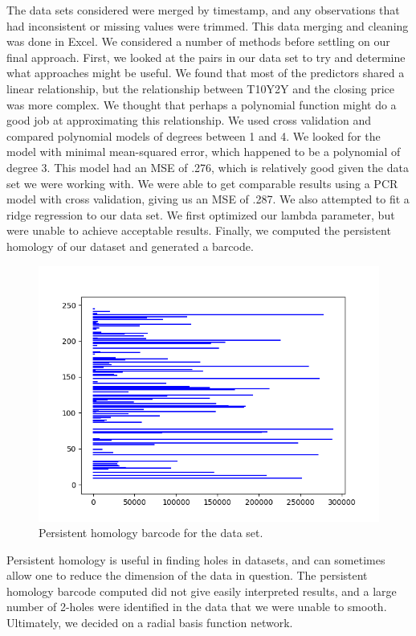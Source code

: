 \documentclass[12pt]{article}
\begin{document}
    The data sets considered were merged by timestamp, and any observations that had inconsistent or missing values were trimmed. This data merging and cleaning was done in Excel. We considered a number of methods before settling on our final approach. First, we looked at the pairs in our data set to try and determine what approaches might be useful. We found that most of the predictors shared a linear relationship, but the relationship between T10Y2Y and the closing price was more complex. We thought that perhaps a polynomial function might do a good job at approximating this relationship. We used cross validation and compared polynomial models of degrees between 1 and 4. We looked for the model with minimal mean-squared error, which happened to be a polynomial of degree 3. This model had an MSE of .276, which is relatively good given the data set we were working with. We were able to get comparable results using a PCR model with cross validation, giving us an MSE of .287. We also attempted to fit a ridge regression to our data set. We first optimized our lambda parameter, but were unable to achieve acceptable results. Finally, we computed the persistent homology of our dataset and generated a barcode. 
    
\begin{figure}[H]
\centering
\includegraphics[scale=.75]{images/SPY-barcode.png}
\caption{Persistent homology barcode for the data set.}
\end{figure}
    
Persistent homology is useful in finding holes in datasets, and can sometimes allow one to reduce the dimension of the data in question. The persistent homology barcode computed did not give easily interpreted results, and a large number of 2-holes were identified in the data that we were unable to smooth. Ultimately, we decided on a radial basis function network.
    
\end{document}
